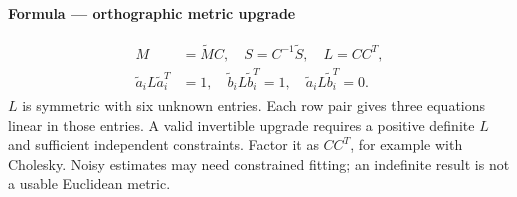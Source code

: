 \documentclass[letterpaper,11pt,english,openany,oneside]{jupyterBook}
\begin{document}
\begin{TextbookBox}
\textbf{Formula — orthographic metric upgrade}\par\smallskip
\begin{equation}\label{equation:lectures/lecture06/factorization:eq-lec06-metric}
\begin{split}\begin{aligned}
M&=\widetilde MC,\quad S=C^{-1}\widetilde S,\quad L=CC^T,\\
\widetilde a_iL\widetilde a_i^T&=1,\quad
\widetilde b_iL\widetilde b_i^T=1,\quad
\widetilde a_iL\widetilde b_i^T=0.
\end{aligned}\end{split}
\end{equation}
\sphinxAtStartPar
\(L\) is symmetric with six unknown entries. Each row pair gives three equations linear in those entries. A valid invertible upgrade requires a positive definite \(L\) and sufficient independent constraints. Factor it as \(CC^T\), for example with Cholesky. Noisy estimates may need constrained fitting; an indefinite result is not a usable Euclidean metric.

\end{TextbookBox}
\end{document}
